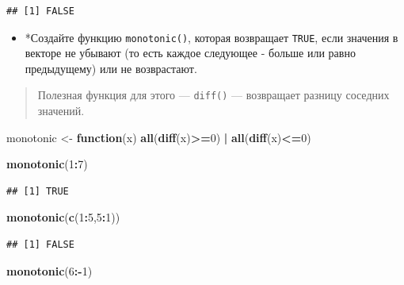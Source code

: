 \documentclass[]{book}
\newenvironment{Shaded}{\begin{snugshade}}{\end{snugshade}}
\newcommand{\KeywordTok}[1]{\textcolor[rgb]{0.13,0.29,0.53}{\textbf{#1}}}
\newcommand{\DecValTok}[1]{\textcolor[rgb]{0.00,0.00,0.81}{#1}}
\newcommand{\StringTok}[1]{\textcolor[rgb]{0.31,0.60,0.02}{#1}}
\newcommand{\ControlFlowTok}[1]{\textcolor[rgb]{0.13,0.29,0.53}{\textbf{#1}}}
\newcommand{\OperatorTok}[1]{\textcolor[rgb]{0.81,0.36,0.00}{\textbf{#1}}}
\newcommand{\NormalTok}[1]{#1}
\providecommand{\tightlist}{%
  \setlength{\itemsep}{0pt}\setlength{\parskip}{0pt}}
\begin{document}
\begin{verbatim}
## [1] FALSE
\end{verbatim}

\begin{itemize}
\tightlist
\item
  *Создайте функцию \texttt{monotonic()}, которая возвращает
  \texttt{TRUE}, если значения в векторе не убывают (то есть каждое
  следующее - больше или равно предыдущему) или не возврастают.
\end{itemize}

\begin{quote}
Полезная функция для этого --- \texttt{diff()} --- возвращает разницу
соседних значений.
\end{quote}

\begin{Shaded}
\begin{Highlighting}[]
\NormalTok{monotonic <-}\StringTok{ }\ControlFlowTok{function}\NormalTok{(x) }\KeywordTok{all}\NormalTok{(}\KeywordTok{diff}\NormalTok{(x)}\OperatorTok{>=}\DecValTok{0}\NormalTok{) }\OperatorTok{|}\StringTok{ }\KeywordTok{all}\NormalTok{(}\KeywordTok{diff}\NormalTok{(x)}\OperatorTok{<=}\DecValTok{0}\NormalTok{)}
\end{Highlighting}
\end{Shaded}

\begin{Shaded}
\begin{Highlighting}[]
\KeywordTok{monotonic}\NormalTok{(}\DecValTok{1}\OperatorTok{:}\DecValTok{7}\NormalTok{)}
\end{Highlighting}
\end{Shaded}

\begin{verbatim}
## [1] TRUE
\end{verbatim}

\begin{Shaded}
\begin{Highlighting}[]
\KeywordTok{monotonic}\NormalTok{(}\KeywordTok{c}\NormalTok{(}\DecValTok{1}\OperatorTok{:}\DecValTok{5}\NormalTok{,}\DecValTok{5}\OperatorTok{:}\DecValTok{1}\NormalTok{))}
\end{Highlighting}
\end{Shaded}

\begin{verbatim}
## [1] FALSE
\end{verbatim}

\begin{Shaded}
\begin{Highlighting}[]
\KeywordTok{monotonic}\NormalTok{(}\DecValTok{6}\OperatorTok{:-}\DecValTok{1}\NormalTok{)}
\end{Highlighting}
\end{Shaded}
\end{document}
